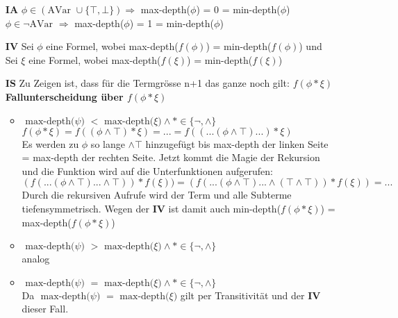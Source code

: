 \documentclass[a4paper,10pt]{scrartcl}
\begin{document}
\begin{itemize}
\item[\textbf{IA}]  $\phi \in (\textrm{AVar }  \cup \{\top, \bot  \}) \Rightarrow$ max-depth($\phi$) = 0 = min-depth($\phi$) \\
 $\phi \in \lnot\textrm{AVar } \Rightarrow$ max-depth($\phi$) = 1 = min-depth($\phi$) 
\item[\textbf{IV}] Sei $\phi$ eine Formel, wobei max-depth($f(\phi)$) =  min-depth($f(\phi)$) und  \\ Sei $\xi$ eine Formel, wobei max-depth($f(\xi)$) = min-depth($f(\xi)$)
\item[\textbf{IS}] Zu Zeigen ist, dass für die Termgrösse n+1 das ganze noch gilt: $f(\phi  * \xi)$ \\
\textbf{Fallunterscheidung über $f(\phi  * \xi)$}
\begin{itemize}
\item $\textrm{ max-depth($\psi$) $<$ max-depth($\xi$)} \land * \in \{ \lnot, \land\}$ \\
$f(\phi  * \xi) = f((\phi \land \top)  * \xi) = ... = f((...(\phi \land \top) ...) * \xi)$ \\
Es werden zu $\phi$ so lange $\land \top$ hinzugefügt bis max-depth der linken Seite = max-depth der rechten Seite. Jetzt kommt die Magie der Rekursion und die Funktion wird auf die Unterfunktionen aufgerufen: \\
$(f(...(\phi \land \top) ... \land \top)) * f(\xi)) = (f(...(\phi \land \top) ... \land (\top \land \top)) * f(\xi)) = ... $ \\
Durch die rekursiven Aufrufe wird der Term und alle Subterme tiefensymmetrisch.
Wegen der \textbf{IV} ist damit auch min-depth($f(\phi * \xi)$) = max-depth($f(\phi * \xi)$)
\item $\textrm{ max-depth($\psi$) $>$ max-depth($\xi$)} \land * \in \{ \lnot, \land\}$ \\
analog
\item  $\textrm{ max-depth($\psi$) $=$ max-depth($\xi$)} \land * \in \{ \lnot, \land\}$ \\
Da $\textrm{ max-depth($\psi$) $=$ max-depth($\xi$)} $ gilt per Transitivität und der \textbf{IV} dieser Fall.
\end{itemize}


\end{itemize}
\end{document}

